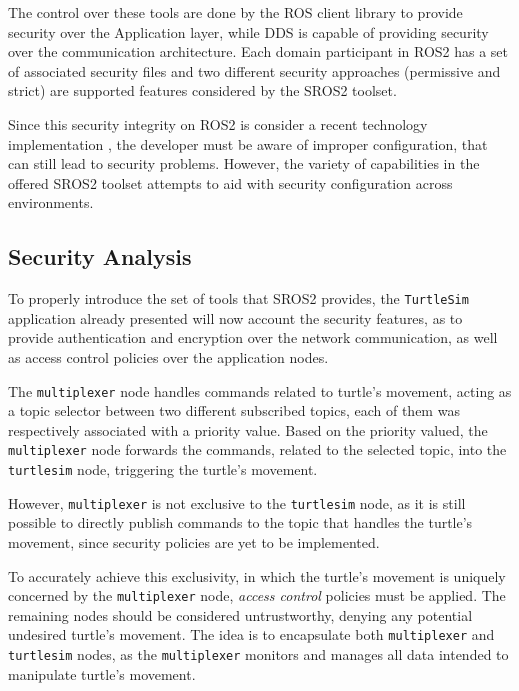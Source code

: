 The control over these tools are done by the ROS client library to provide security over the Application layer, while DDS is capable of providing security over the communication architecture. Each domain participant in ROS2 has a set of associated security files and two different security approaches (permissive and strict) are supported features considered by the SROS2 toolset.

Since this security integrity on ROS2 is consider a recent technology implementation \cite{ros-dds-integration}, the developer must be aware of improper configuration, that can still lead to security problems. However, the variety of capabilities in the offered SROS2 toolset attempts to aid with security configuration across environments. 

\subsection{Security Analysis}

To properly introduce the set of tools that SROS2 provides, the \texttt{TurtleSim} application already presented will now account the security features, as to provide authentication and encryption over the network communication, as well as access control policies over the application nodes. 
            
The \texttt{multiplexer} node handles commands related to turtle's movement, acting as a topic selector between two different subscribed topics, each of them was respectively associated with a priority value. Based on the priority valued, the \texttt{multiplexer} node forwards the commands, related to the selected topic, into the \texttt{turtlesim} node, triggering the turtle's movement. 

However, \texttt{multiplexer} is not exclusive to the \texttt{turtlesim} node, as it is still possible to directly publish commands to the topic that handles the turtle's movement, since security policies are yet to be implemented.

To accurately achieve this exclusivity, in which the turtle's movement is uniquely concerned by the \texttt{multiplexer} node, \textit{access control} policies must be applied. The remaining nodes should be considered untrustworthy, denying any potential undesired turtle's movement. The idea is to encapsulate both \texttt{multiplexer} and \texttt{turtlesim} nodes, as the \texttt{multiplexer} monitors and manages all data intended to manipulate turtle's movement.


